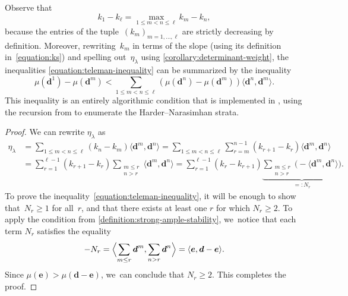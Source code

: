 \documentclass[JEP,XML,SOM,Unicode,NoEqCountersInSection,published]{cedram}
\theoremstyle{plain}
\theoremstyle{definition}
\newcommand\tuple[1]{\ensuremath{{\boldsymbol{#1}}}}
\begin{document}
Observe that\vspace*{-5pt}
\begin{equation*}
k_1-k_\ell=\max_{1\leq m<n\leq\ell}k_m-k_n,
\end{equation*}
because the entries of the tuple~$(k_m)_{m=1,\ldots,\ell}$ are strictly decreasing by definition.
Moreover,
rewriting~$k_m$ in terms of the slope
(using its definition in~\eqref{equation:ks})
and spelling out~$\eta_\lambda$ using \cref{corollary:determinant-weight},
the inequalities \eqref{equation:teleman-inequality}
can be summarized by the inequality\vspace*{-1pt}
\begin{equation}
\label{equation:teleman-inequality-for-real}
\mu(\tuple{d}^1)-\mu(\tuple{d}^m)
<
\sum_{1\leq m<n\leq\ell}\left( \mu(\tuple{d}^n)-\mu(\tuple{d}^m) \right)\langle\tuple{d}^n,\tuple{d}^m\rangle.
\end{equation}
This inequality is an entirely algorithmic condition that is implemented in \cite{quivertools},
using the recursion from \cite[Cor.\,3.5]{MR1974891} to enumerate the Harder--Narasimhan strata.

\begin{proof}
We can rewrite $\eta_\lambda$ as\vspace*{-5pt}
\begin{align*}
\eta_\lambda
&= \sum_{1\leq m < n\leq\ell} (k_n - k_m)\langle \tuple{d}^m,\tuple{d}^n \rangle= \sum_{1\leq m < n\leq\ell} \sum_{r = m}^{n-1} (k_{r+1} - k_r) \langle \tuple{d}^m,\tuple{d}^n \rangle \\
&= \sum_{r = 1}^{\ell-1} (k_{r+1} - k_r)\sum_{\substack{m \leq r \\ n > r}} \langle \tuple{d}^m, \tuple{d}^n \rangle= \sum_{r = 1}^{\ell-1} (k_r - k_{r+1})\underbrace{\sum_{\substack{m \leq r \\ n > r}} \bigl( - \langle \tuple{d}^m, \tuple{d}^n \rangle\bigr)}_{=: N_r}.
\end{align*}
To prove the inequality~\eqref{equation:teleman-inequality},
it will be enough to show that~$N_r \geq 1$ for all~$r$,
and that there exists at least one $r$ for which $N_r \geq 2$.
To apply the condition from \cref{definition:strong-ample-stability}, we~notice that each term $N_r$ satisfies the equality
\begin{equation*}
-N_r = \Bigl\langle \sum_{m \leq r} \tuple{d}^m, \sum_{n > r} \tuple{d}^n \Bigr\rangle
= \langle \tuple{e}, \tuple{d} - \tuple{e} \rangle.
\end{equation*}
Since $\mu(\tuple{e}) > \mu(\tuple{d} - \tuple{e})$, we~can conclude that $N_r \geq 2$.
This completes the proof.
\end{proof}
\end{document}
